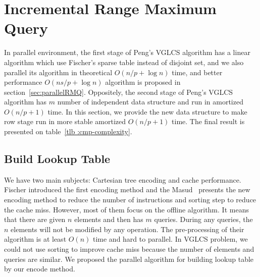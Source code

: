 \section{Incremental Range Maximum Query}
\label{sec:parallelIRMQ}

In parallel environment, the first stage of Peng's VGLCS algorithm has a
linear algorithm which use Fischer's sparse table instead of disjoint
set, and we also parallel its algorithm in theoretical $O(n / p + \log
n)$ time, and better performance $O(n s / p + \log n)$ algorithm is
proposed in section~\ref{sec:parallelRMQ}.  Oppositely, the second stage
of Peng's VGLCS algorithm has $m$ number of independent data structure
and run in amortized $O(n / p + 1)$ time.  In this section, we provide
the new data structure to make row stage run in more stable amortized
$O(n / p + 1)$ time.  The final result is presented on table~\ref{tlb
:cmp-complexity}.

\iffalse
VGLCS 問題主要分成縱向和橫向兩階段，縱向處理每一列的區間極值查找，橫向處理每一行的區間極值查找，
兩者合併構成區域極值查找。在縱向方面為數個獨立的數據結構，這部分易於平行；
相反地，在橫向方面，需要共同協作一個數據結構。
綜觀這兩者的差異，縱向需要動態的後綴插入和區間查詢，而橫向可以離線完成區間查找。
在上一節中，我們提出在橫向處理的實作，若限制上述的實作方案在單一處理器上，
時間複雜度的瓶頸在於縱向的動態更新與查找。

在這個章節中，我們提出支持動態插入和區間查找的數據結構，最後的成果如表 \ref{tlb:cmp-complexity}。
\fi




\subsection{Build Lookup Table}

We have two main subjects: Cartesian tree encoding and cache
performance.  Fischer introduced the first encoding method and the
Masud~\cite{Hasan2010CacheOA} presents the new encoding method to reduce
the number of instructions and sorting step to reduce the cache miss.
However, most of them focus on the offline algorithm.  It means that
there are given $n$ elements and then has $m$ queries. During any
queries, the $n$ elements will not be modified by any operation.  The
pre-processing of their algorithm is at least $O(n)$ time and hard to
parallel.  In VGLCS problem, we could not use sorting to improve cache
miss because the number of elements and queries are similar.  We
proposed the parallel algorithm for building lookup table by our encode
method.

